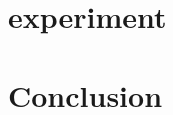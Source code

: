 \documentclass{article}
\begin{document}
\section{experiment}
\label{sec:experiment}

\section{Conclusion}
\label{sec:conclusion}




\end{document}

